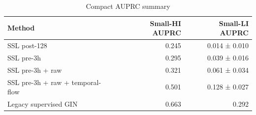 \begin{table}[t]
\centering
\caption{Compact AUPRC summary}
\begin{tabular}{lrr}
\toprule
Method & Small-HI AUPRC & Small-LI AUPRC \\
\midrule
SSL post-128 & 0.245 & 0.014 ± 0.010 \\
SSL pre-3h & 0.295 & 0.039 ± 0.016 \\
SSL pre-3h + raw & 0.321 & 0.061 ± 0.034 \\
SSL pre-3h + raw + temporal-flow & 0.501 & 0.128 ± 0.027 \\
Legacy supervised GIN & 0.663 & 0.292 \\
\bottomrule
\end{tabular}
\end{table}
